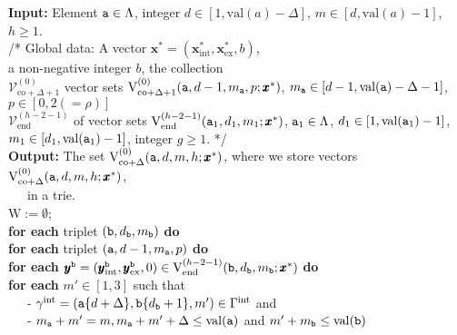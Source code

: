 \documentclass[12pt]{article}
\newcommand{\intt}{\mathrm{int}}
\newcommand{\ex}{\mathrm{ex}}
\newcommand{\co}{\mathrm{co}}
\newcommand{\V}{{\rm V}}
\newcommand{\ta}{{\tt a}}
\newcommand{\tb}{{\tt b}}
\newcommand{\y}{\pmb{y}}
\newcommand{\x}{\pmb{x}}
\newcommand{\1}{\pmb{1}}
\newcommand{\0}{\pmb{0}}
\newcommand{\val}{\mathrm{val}}
\newcommand{\en}{\mathrm{end}}
\newcommand{\W}{\mathrm{W}}
\newcommand{\Vv}{\mathcal{V}}
\begin{document}
\begin{tabbing}
{\bf Input:}
Element $\ta \in \Lambda$, 
integer $d \in[1,\val(a)-\Delta]$, 
$m \in [d, \val(a)-1]$, $h \geq 1$. \\
\hspace{3mm}  /* Global data: A vector $\x^* = (\x^*_{\intt}, \x^*_{\ex}, b)$, \+ \\
a non-negative integer $b$,
                 the collection  \\
                 $\Vv_{\co+ \Delta + 1}^{(0)}$  vector sets 
                 $\V_{\co + \Delta  +1}^{(0)}(\ta, d-1, m_{\ta}, 
                 p; 
                 \x^*)$, 
                 $m_{\ta} \in [d-1, \val(\ta) -\Delta -1]$, \\
                 $p \in [0, 2 (= \rho)]$\\
                 $\Vv_{\en}^{(h-2-1)}$ of vector sets  
                 $\V_{\en}^{(h-2-1)}(\ta_1, d_1, m_1; \x^*)$, 
                 $\ta_1 \in \Lambda$,
                  $d_1 \in [1, \val(\ta_1)-1]$, \\
                  $m_1 \in [d_1, \val(\ta_1) - 1]$,
                  integer $g \geq 1$. */ \- \\
{\bf Output:} The set $\V_{\co + \Delta}^{(0)}(\ta, d, m, h; \x^*)$, where 
we store vectors $\V_{\co + \Delta}^{(0)}(\ta, d, m, h; \x^*)$, \\
 ~~~in a trie.  \\
$\W := \emptyset$; \\
{\bf for each} triplet  $(\tb, d_{\tb}, m_{\tb})$ {\bf do} \+ \\
    {\bf for each} triplet $(\ta, d-1, m_{\ta}, p)$ {\bf do} \+ \\
    {\bf for each} $\y^{\tb} = (\y^{\tb}_{\intt}, \y^{\tb}_{\ex}, 0) \in 
    \V_{\en}^{(h-2-1)}(\tb, d_{\tb}, m_{\tb}; \x^*)$
                         {\bf do} \+ \\
            {\bf for each} $m' \in [1, 3]$ such that  \\ 
                      	~~~- $\gamma^{\intt} = (\ta \{d+\Delta\}, \tb  \{d_{\tb} + 1\},
                       m') \in \Gamma^{\intt}$ and\\
                      ~~~- $m_{\ta} + m' = m, 
                      m_{\ta} + m' + \Delta \leq \val(\ta)$ and 
                      $m' +m_{\tb} \leq \val(\tb)$
                      

\end{tabbing}
\end{document}
